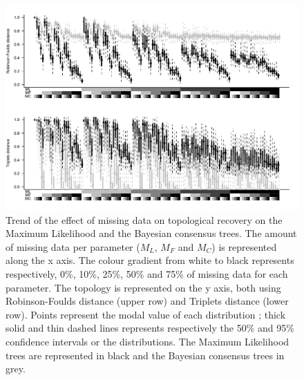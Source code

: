 \documentclass[12pt,letterpaper]{article}
\begin{document}
\begin{figure} 
\centering
    \includegraphics[width=1\textwidth]{Figures/In_main/ML+Baycon-AllParam-RF+Tr-BW.pdf}
\caption{Trend of the effect of missing data on topological recovery on the Maximum Likelihood and the Bayesian consensus trees. The amount of missing data per parameter ($M_{L}$, $M_{F}$ and $M_{C}$) is represented along the x axis. The colour gradient from white to black represents respectively, 0\%, 10\%, 25\%, 50\% and 75\% of missing data for each parameter. The topology is represented on the y axis, both using Robinson-Foulds distance (upper row) and Triplets distance (lower row). Points represent the modal value of each distribution ; thick solid and thin dashed lines represents respectively the 50\% and 95\% confidence intervals or the distributions. The Maximum Likelihood trees are represented in black and the Bayesian consensus trees in grey.}
\label{Fig_Results-global_perparam} %
\end{figure}

\end{document}
